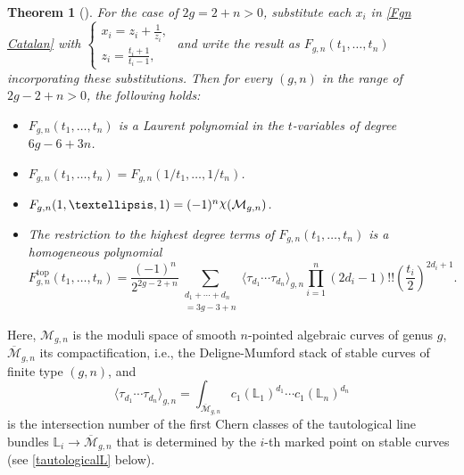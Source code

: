 \documentclass{amsart}
\newtheorem{thm}{Theorem}[section]
\theoremstyle{definition}
\numberwithin{equation}{section}
\numberwithin{figure}{section}
\def\rchi{{\hbox{\raise1.5pt\hbox{$\chi$}}}}
\newcommand{\be}{\begin{equation}}
\newcommand{\ee}{\end{equation}}
\newcommand{\Mbar}{{\overline{\mathcal{M}}}}
\newcommand{\bL}{{\mathbb{L}}}
\newcommand{\cM}{{\mathcal{M}}}
\newcommand{\la}{{\langle}}
\newcommand{\ra}{{\rangle}}
\newcommand{\lrar}{\longrightarrow}
\begin{document}
\begin{thm}[\cite{CMS, OM4, OM5,DMSS, MP2012}]
\label{thmCatalan}
For the case of $2g=2+n>0$,
substitute each $x_i$ in \eqref{Fgn Catalan}  with
$
\begin{cases}
x_i = z_i + \frac{1}{z_i},\\
z_i= \frac{t_i + 1}{t_i-1},
\end{cases}
$
and write the result as $F_{g,n}(t_1,\dots,t_n)$ incorporating these substitutions.
Then for every $(g,n)$ in the range of $2g-2+n>0$, the following holds:
\begin{itemize}
\item $F_{g,n}(t_1,\dots,t_n)$ is a Laurent polynomial in 
the $t$-variables of  degree $6g-6+3n$.
\item $F_{g,n}(t_1,\dots,t_n) = F_{g,n}(1/t_1,\dots,1/t_n)$.
\item $F_{g,n}(1,\dots,1) = (-1)^n \rchi(\cM_{g,n})$.
\item The restriction to the highest degree terms of $F_{g,n}(t_1,\dots,t_n)$
is a homogeneous polynomial
\be
\label{WK}
 F_{g,n}^{\text{top}}(t_1,\dots,t_n)
=\frac{(-1)^n}{2^{2g-2+n}}
\sum_{\substack{d_1+\cdots+d_n\\
=3g-3+n}}\la\tau_{d_1}\cdots \tau_{d_n}
\ra_{g,n}
\prod_{i=1}^n (2d_i-1)!!
\left(\frac{t_i}{2}\right)^{2d_i+1}.
\ee
\end{itemize}
\end{thm}


Here, $\cM_{g,n}$ is the moduli space of smooth $n$-pointed
algebraic curves of genus $g$, $\Mbar_{g,n}$ its compactification, 
i.e., 
the Deligne-Mumford stack of
stable curves of finite type $(g,n)$, and
$$
\la\tau_{d_1}\cdots \tau_{d_n}\ra_{g,n} 
=\int_{\Mbar_{g,n}} c_1(\bL_1)^{d_1}\cdots c_1(\bL_n)^{d_n}
$$
is the intersection number of the first Chern classes of the tautological
line bundles $\bL_i\lrar \Mbar_{g,n}$   that is determined by the 
$i$-th marked point on stable curves (see \eqref{tautologicalL} below).
\end{document}
